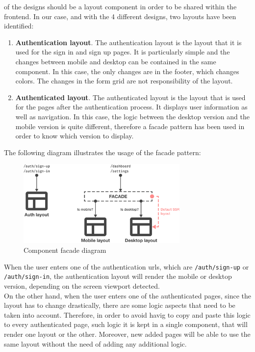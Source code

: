 \documentclass[./memory.tex]{subfiles}
\begin{document}
of the designs should be a layout component in order to be shared within the
frontend. In our case, and with the 4 different designs, two layouts have been
identified:
\begin{enumerate}[label = -]
	\item\textbf{Authentication layout}. The authentication layout is the layout
	that it is used for the sign in and sign up pages. It is particularly
	simple and the changes between mobile and desktop can be contained in the
	same component. In this case, the only changes are in the footer, which
	changes colors. The changes in the form grid are not responsibility of the
	layout.
	\item\textbf{Authenticated layout}. The authenticated layout is the layout
	that is used for the pages after the authentication process. It displays
	user information as well as navigation. In this case, the logic between
	the desktop version and the mobile version is quite different, therefore a
	facade pattern has been used in order to know which version to display.
\end{enumerate}
The following diagram illustrates the usage of the facade pattern:
\begin{figure}[H]
	\centering
	\includegraphics[width=0.75\textwidth]{./assets/designs/layout-facade.png}
	\caption{Component facade diagram}
\end{figure}
When the user enters one of the authentication urls, which are
\texttt{/auth/sign-up} or \texttt{/auth/sign-in}, the authentication layout will
render the mobile or desktop version, depending on the screen viewport detected.
\\
On the other hand, when the user enters one of the authenticated pages, since
the layout has to change drastically, there are some logic aspects that need to
be taken into account. Therefore, in order to avoid havig to copy and paste this
logic to every authenticated page, such logic it is kept in a single component,
that will render one layout or the other. Moreover, new added pages will be able
to use the same layout without the need of adding any additional logic.
\end{document}
